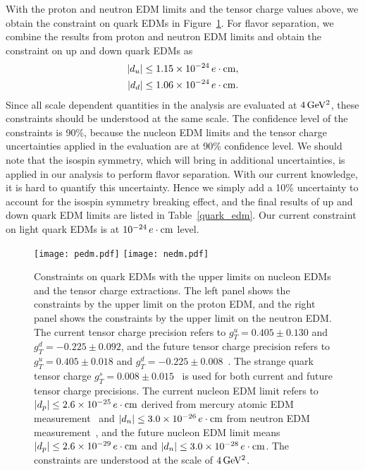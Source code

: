 \documentclass[aps,prd,twocolumn,groupedaddress,showpacs,superscriptaddress,floatfix,nofootinbib,10pt]{revtex4-1}
\begin{document}
With the proton and neutron EDM limits and the tensor charge values above, we obtain the constraint on quark EDMs in Figure~\ref{nucleon_edm}. For flavor separation, we combine the results from proton and neutron EDM limits and obtain the constraint on up and down quark EDMs as
\begin{align}
|d_u|&\leq1.15\times10^{-24}\,e\cdot{\rm cm},\\
|d_d|&\leq1.06\times10^{-24}\,e\cdot{\rm cm}.
\end{align}
Since all scale dependent quantities in the analysis are evaluated at $4\,\rm GeV^2$, these constraints should be understood at the same scale. The confidence level of the constraints is 90\%, because the nucleon EDM limits and the tensor charge uncertainties applied in the evaluation are at 90\% confidence level. We should note that the isospin symmetry, which will bring in additional uncertainties, is applied in our analysis to perform flavor separation. With our current knowledge, it is hard to quantify this uncertainty. Hence we simply add a 10\% uncertainty to account for the isospin symmetry breaking effect, and the final results of up and down quark EDM limits are listed in Table~\ref{quark_edm}. Our current constraint on light quark EDMs is at $10^{-24}\,e\cdot{\rm cm}$ level.


\begin{figure*}[ht]
\centering
\texttt{[image: pedm.pdf]}
\texttt{[image: nedm.pdf]}
\caption{Constraints on quark EDMs with the upper limits on nucleon EDMs and the tensor charge extractions. The left panel shows the constraints by the upper limit on the proton EDM, and the right panel shows the constraints by the upper limit on the neutron EDM. The current tensor charge precision refers to $g_T^{u}=0.405\pm0.130$ and $g_T^{d}=-0.225\pm0.092$, and the future tensor charge precision refers to $g_T^u=0.405\pm0.018$ and $g_T^d=-0.225\pm0.008$~\cite{Ye:2016prn}. The strange quark tensor charge $g_T^{s}=0.008\pm0.015$~\cite{Bhattacharya:2015esa} is used for both current and future tensor charge precisions. The current nucleon EDM limit refers to $|d_p|\leq2.6\times10^{-25}\,e\cdot{\rm cm}$ derived from mercury atomic EDM measurement~\cite{Graner:2016ses} and $|d_n|\leq3.0\times10^{-26}\,e\cdot{\rm cm}$ from neutron EDM measurement~\cite{Afach:2015sja}, and the future nucleon EDM limit means $|d_p|\leq2.6\times10^{-29}\,e\cdot{\rm cm}$ and $|d_n|\leq3.0\times10^{-28}\,e\cdot{\rm cm}$. The constraints are understood at the scale of $4\,\rm GeV^2$.}\label{nucleon_edm}
\end{figure*}
\end{document}
